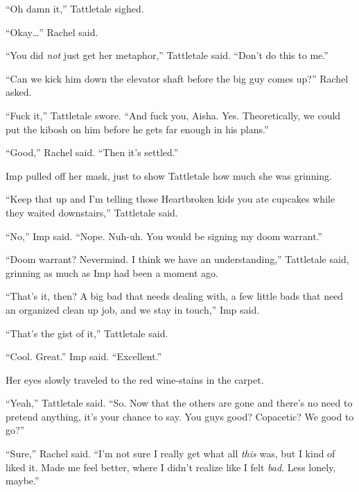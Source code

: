 ``Oh damn it,'' Tattletale sighed.



``Okay\ldots'' Rachel said.



``You did \emph{not} just get her metaphor,'' Tattletale said.  ``Don't do this to me.''



``Can we kick him down the elevator shaft before the big guy comes up?''  Rachel asked.



``Fuck it,'' Tattletale swore.  ``And fuck you, Aisha.  Yes.  Theoretically, we could put the kibosh on him before he gets far enough in his plans.''



``Good,'' Rachel said.  ``Then it's settled.''



Imp pulled off her mask, just to show Tattletale how much she was grinning.



``Keep that up and I'm telling those Heartbroken kids you ate cupcakes while they waited downstairs,'' Tattletale said.



``No,'' Imp said.  ``Nope.  Nuh-uh.  You would be signing my doom warrant.''



``Doom warrant?  Nevermind.  I think we have an understanding,'' Tattletale said, grinning as much as Imp had been a moment ago.



``That's it, then?  A big bad that needs dealing with, a few little bads that need an organized clean up job, and we stay in touch,'' Imp said.



``That's the gist of it,'' Tattletale said.



``Cool.  Great.''  Imp said.  ``Excellent.''



Her eyes slowly traveled to the red wine-stains in the carpet.



``Yeah,'' Tattletale said.  ``So.  Now that the others are gone and there's no need to pretend anything, it's your chance to say.  You guys good?  Copacetic?  We good to go?''



``Sure,'' Rachel said.  ``I'm not sure I really get what all \emph{this} was, but I kind of liked it.  Made me feel better, where I didn't realize like I felt \emph{bad}.  Less lonely, maybe.''



